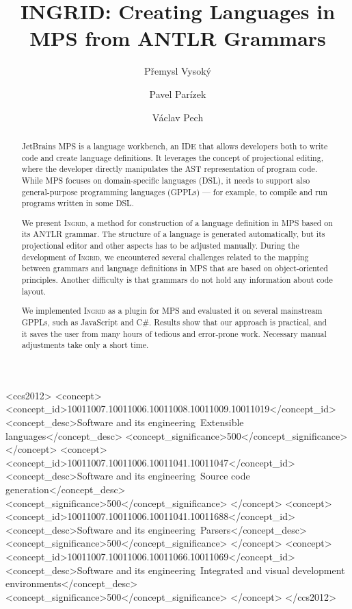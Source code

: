\documentclass[sigconf]{acmart}
\begin{document}
\title{INGRID: Creating Languages in MPS from ANTLR Grammars}


\author{P\v{r}emysl Vysok\'y}

\author{Pavel Par\'izek}

\author{V\'aclav Pech}



\begin{abstract}
JetBrains MPS is a language workbench, an IDE that allows developers both to write code and create language definitions.
It leverages the concept of projectional editing, where the developer directly manipulates the AST representation of program code.
While MPS focuses on domain-specific languages (DSL), it needs to support also general-purpose programming languages (GPPLs) --- for example, to compile and run programs written in some DSL.

We present \textsc{Ingrid}, a method for construction of a language definition in MPS based on its ANTLR grammar.
The structure of a language is generated automatically, but its projectional editor and other aspects has to be adjusted manually.
During the development of \textsc{Ingrid}, we encountered several challenges related to the mapping between grammars and language definitions in MPS that are based on object-oriented principles.
Another difficulty is that grammars do not hold any information about code layout.

We implemented \textsc{Ingrid} as a plugin for MPS and evaluated it on several mainstream GPPLs, such as JavaScript and C\#.
Results show that our approach is practical, and it saves the user from many hours of tedious and error-prone work.
Necessary manual adjustments take only a short time.
\end{abstract}


\begin{CCSXML}
<ccs2012>
<concept>
<concept_id>10011007.10011006.10011008.10011009.10011019</concept_id>
<concept_desc>Software and its engineering~Extensible languages</concept_desc>
<concept_significance>500</concept_significance>
</concept>
<concept>
<concept_id>10011007.10011006.10011041.10011047</concept_id>
<concept_desc>Software and its engineering~Source code generation</concept_desc>
<concept_significance>500</concept_significance>
</concept>
<concept>
<concept_id>10011007.10011006.10011041.10011688</concept_id>
<concept_desc>Software and its engineering~Parsers</concept_desc>
<concept_significance>500</concept_significance>
</concept>
<concept>
<concept_id>10011007.10011006.10011066.10011069</concept_id>
<concept_desc>Software and its engineering~Integrated and visual development environments</concept_desc>
<concept_significance>500</concept_significance>
</concept>
</ccs2012>
\end{CCSXML}
\end{document}
